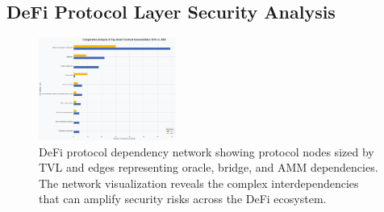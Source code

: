 \subsection{DeFi Protocol Layer Security Analysis}
\label{sec:results_defi_protocol}


\begin{figure}[H]
\centering
\includegraphics[width=0.4\textwidth]{../figure/Fig10.png}
\caption{DeFi protocol dependency network showing protocol nodes sized by TVL and edges representing oracle, bridge, and AMM dependencies. The network visualization reveals the complex interdependencies that can amplify security risks across the DeFi ecosystem.}
\label{fig:defi_network_dependencies}
\end{figure}

